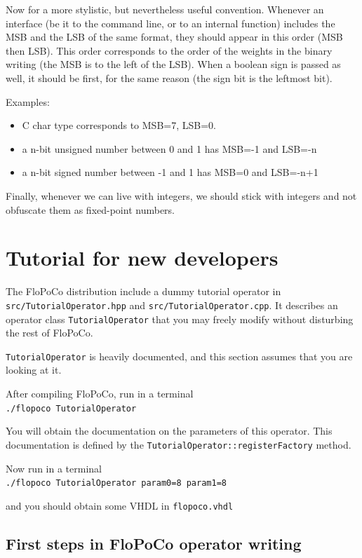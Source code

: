 \documentclass{article}
\begin{document}
Now for a more stylistic, but nevertheless useful convention. Whenever an interface (be it to the command line, or to an internal function) includes the MSB and the LSB of the same format, they should appear in this order (MSB then LSB). This order corresponds to the order of the weights in the binary writing (the MSB is to the left of the LSB). 
When a boolean sign is passed as well, it should be first, for the same reason (the sign bit is the leftmost bit).

Examples:
\begin{itemize}
\item C char type corresponds to MSB=7, LSB=0.
\item a n-bit unsigned number between 0 and 1 has MSB=-1 and LSB=-n
\item a n-bit signed number between -1 and 1 has MSB=0 and LSB=-n+1
\end{itemize}

Finally, whenever we can live with integers, we should stick with integers and not obfuscate them as fixed-point numbers.

\section{Tutorial for new developers \label{sec:tutorial}}

The FloPoCo distribution include a dummy tutorial operator in \texttt{src/TutorialOperator.hpp} and \texttt{src/TutorialOperator.cpp}.
It describes an operator class \texttt{TutorialOperator} that you may freely modify without disturbing the rest of FloPoCo.

\texttt{TutorialOperator} is heavily documented, and this section assumes that you are looking at it.

After compiling FloPoCo, run in a terminal\\
\verb!./flopoco TutorialOperator!

You will obtain the documentation on the parameters of this operator.
This documentation is defined by the \texttt{TutorialOperator::registerFactory} method.

Now run in a terminal\\
\verb!./flopoco TutorialOperator param0=8 param1=8!

and you should obtain  some VHDL in \texttt{flopoco.vhdl}


\subsection{First steps in FloPoCo operator writing}
\end{document}
